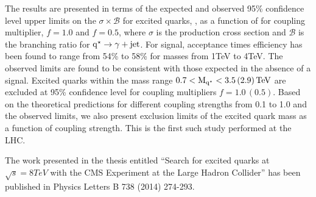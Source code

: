 The results are presented in terms of the expected and observed 95\% confidence level upper limits on the $\sigma\times\mathcal{B}$ for excited quarks, \qstar, as
a function of \mqstar for coupling multiplier, $f=1.0$ and $f=0.5$, where $\sigma$ is the production cross section and $\mathcal{B}$ is
the branching ratio for $\mathrm{q^\star}\to\gamma+\mathrm{jet}$. For \qstar signal, acceptance times efficiency has been found to range from 54\% to 58\% for \qstar masses from 1\unit{TeV}
to 4\unit{TeV}. The observed limits are found to be consistent with those expected in the absence of a signal. Excited quarks within the mass range 
$0.7<\mathrm{M_{q^\star}}<3.5\,(2.9)\mathrm{\,TeV}$ are excluded at 95\% confidence level for coupling multipliers $f=1.0\,(0.5)$. Based on the theoretical predictions for different
coupling strengths from 0.1 to 1.0 and the observed limits, we also present exclusion limits of the excited quark mass as a function of coupling strength. This is the
first such study performed at the LHC.

The work presented in the thesis entitled ``Search for excited quarks at $\sqrt{s}=8\unit{TeV}$ with the CMS Experiment at the Large Hadron Collider'' has been published
in Physics Letters B 738 (2014) 274-293.

